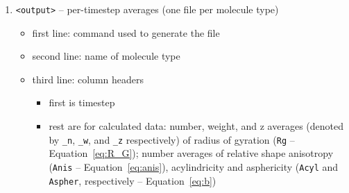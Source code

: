 \begin{enumerate}[nosep,leftmargin=20pt]
  \item \texttt{<output>} -- per-timestep averages (one file per molecule
    type)
    \begin{itemize}[nosep,leftmargin=5pt]
      \item first line: command used to generate the file
      \item second line: name of molecule type
      \item third line: column headers
        \begin{itemize}[nosep,leftmargin=10pt]
          \item first is timestep
          \item rest are for calculated data: number, weight, and z
            averages (denoted by \texttt{\_n}, \texttt{\_w},
            and \texttt{\_z} respectively) of radius of gyration
            (\texttt{Rg} -- Equation~\eqref{eq:R_G}); number averages of
            relative shape anisotropy
            (\texttt{Anis} -- Equation~\eqref{eq:anis}), acylindricity
            and asphericity (\texttt{Acyl} and \texttt{Aspher},
            respectively -- Equation~\eqref{eq:b})
        \end{itemize}
    \end{itemize}
\end{enumerate}

